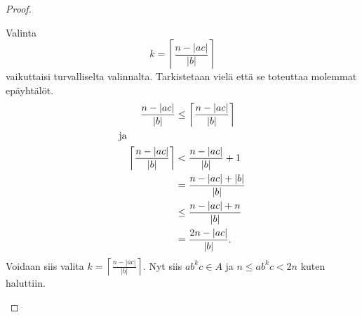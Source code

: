 \documentclass[a4paper,11pt,draft]{article}
\newcommand{\ceil}[1]{{\left\lceil#1\right\rceil}}
\begin{document}
\begin{enumerate}
\begin{enumerate}
\begin{proof}
\begin{description}
          Valinta
          \begin{equation*}
              k = \ceil{\frac{n - |ac|}{|b|}}
          \end{equation*}
          vaikuttaisi turvalliselta valinnalta. Tarkistetaan vielä että se
          toteuttaa molemmat epä\-yh\-tä\-löt.
          \begin{align*}
            \frac{n - |ac|}{|b|} & \le \ceil{\frac{n - |ac|}{|b|}} \\
            \intertext{ja}\quad
            \ceil{\frac{n - |ac|}{|b|}}
            & < \frac{n - |ac|}{|b|} + 1 \\
            & = \frac{n - |ac| + |b|}{|b|} \\
            & \le \frac{n - |ac| + n}{|b|} \\
            & = \frac{2n - |ac|}{|b|}.
          \end{align*}
          Voidaan siis valita $k = \ceil{\frac{n - |ac|}{|b|}}$. Nyt
          siis $ab^kc \in A$ ja $n \le ab^kc < 2n$ kuten haluttiin.
      \end{description} 
    \end{proof}
\end{enumerate}


\end{enumerate}
\end{document}

